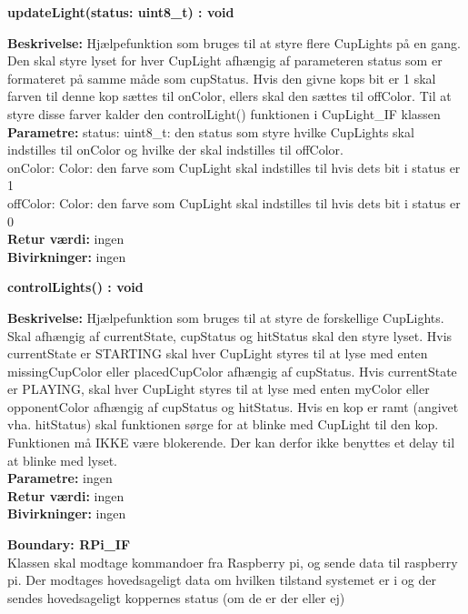 \documentclass[Arkitektur/System_main.tex]{subfiles}
\begin{document}
\textbf{updateLight(status: uint8\_t) : void}
\begin{adjustwidth}{1cm}{0pt}
\textbf{Beskrivelse:} Hjælpefunktion som bruges til at styre flere CupLights på en gang. Den skal styre lyset for hver CupLight afhængig af parameteren status som er formateret på samme måde som cupStatus. Hvis den givne kops bit er 1 skal farven til denne kop sættes til onColor, ellers skal den sættes til offColor. Til at styre disse farver kalder den controlLight() funktionen i CupLight\_IF klassen\\[0.2cm]
\textbf{Parametre:} status: uint8\_t: den status som styre hvilke CupLights skal indstilles til onColor og hvilke der skal indstilles til offColor.\\
onColor: Color: den farve som CupLight skal indstilles til hvis dets bit i status er 1\\
offColor: Color: den farve som CupLight skal indstilles til hvis dets bit i status er 0\\[0.2cm]
\textbf{Retur værdi:} ingen\\[0.2cm]
\textbf{Bivirkninger:} ingen\\[0.2cm]
\end{adjustwidth}

\textbf{controlLights() : void}
\begin{adjustwidth}{1cm}{0pt}
\textbf{Beskrivelse:} Hjælpefunktion som bruges til at styre de forskellige CupLights. Skal afhængig af currentState, cupStatus og hitStatus skal den styre lyset. Hvis currentState er STARTING skal hver CupLight styres til at lyse med enten missingCupColor eller placedCupColor afhængig af cupStatus. Hvis currentState er PLAYING, skal hver CupLight styres til at lyse med enten myColor eller opponentColor afhængig af cupStatus og hitStatus. Hvis en kop er ramt (angivet vha. hitStatus) skal funktionen sørge for at blinke med CupLight til den kop. Funktionen må IKKE være blokerende. Der kan derfor ikke benyttes et delay til at blinke med lyset. \\[0.2cm]
\textbf{Parametre:} ingen\\[0.2cm]
\textbf{Retur værdi:} ingen\\[0.2cm]
\textbf{Bivirkninger:} ingen\\[0.2cm]
\end{adjustwidth}




{\large\textbf{Boundary:  RPi\_IF}}\\
Klassen skal modtage kommandoer fra Raspberry pi, og sende data til raspberry pi. Der modtages hovedsageligt data om hvilken tilstand systemet er i og der sendes hovedsageligt koppernes status (om de er der eller ej)
\end{document}
